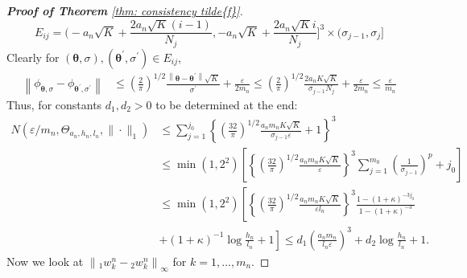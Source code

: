 \begin{proof}[\hypertarget{proof of thm consistency f tilde}{\textbf{Proof of Theorem}} \ref{thm: consistency tilde{f}}]
    $$
    E_{i j}=\bigg(-a_n\sqrt{K}+\frac{2 a_n\sqrt{K}(i-1)}{N_j},-a_n\sqrt{K}+\frac{2 a_n\sqrt{K} i}{N_j}\bigg]^3 \times (\sigma_{j-1}, \sigma_j ]
    $$
    Clearly for $(\boldsymbol{\theta}, \sigma),\left(\boldsymbol{\theta}^{\prime}, \sigma^{\prime}\right) \in E_{i j}$,
    \begin{align*}
    \left\|\phi_{\boldsymbol{\theta}, \sigma}-\phi_{\boldsymbol{\theta}^{\prime}, \sigma^{\prime}}\right\| & \leq\left(\frac{2}{\pi}\right)^{1 / 2} \frac{\left\|\boldsymbol{\theta}-\boldsymbol{\theta}^{\prime}\right\| \sqrt{K}}{\sigma^{\prime}}+\frac{\varepsilon}{2m_n} \leq\left(\frac{2}{\pi}\right)^{1 / 2} \frac{2 a_n K \sqrt{K}}{\sigma_{j-1} N_j}+\frac{\varepsilon}{2m_n} \leq \frac{\varepsilon}{m_n}
    \end{align*}
    Thus, for constants $d_1, d_2 >0$ to be determined at the end:
    \begin{align*}
    N\left(\varepsilon/m_n, \Theta_{a_n, h_n, l_n},\|\cdot\|_1\right) & \leq \sum_{j=1}^{j_0}\left\{\left(\frac{32}{\pi}\right)^{1 / 2} \frac{a_n m_n K \sqrt{K}}{\sigma_{j-1} \varepsilon}+1\right\}^3 \\
    & \leq \min \left(1,2^{2}\right)\left[\left\{\left(\frac{32}{\pi}\right)^{1 / 2} \frac{a_n m_n K \sqrt{K}}{\varepsilon}\right\}^3 \sum_{j=1}^{m_0}\left(\frac{1}{\sigma_{j-1}}\right)^p+j_0\right] \\
    & \leq \min \left(1,2^{2}\right)\left[\left\{\left(\frac{32}{\pi}\right)^{1 / 2} \frac{a_n m_n K \sqrt{
    K}}{\varepsilon l_n}\right\}^3 \frac{1-(1+\kappa)^{-3 j_0}}{1-(1+\kappa)^{-3}}\right. \\
    & \left.+(1+\kappa)^{-1} \log \frac{h_n}{l_n}+1\right] \leq d_1\left(\frac{a_n m_n}{l_n \varepsilon}\right)^3+d_2 \log \frac{h_n}{l_n}+1.
    \end{align*}
    Now we look at $\left\|{}_{1}w^n_k - {}_{2}w^n_k \right\|_\infty$ for $k=1,\ldots,m_n$. 
    

\end{proof}
